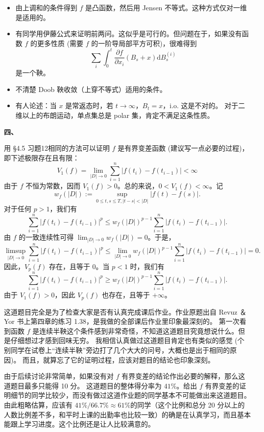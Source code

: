 {\begin{itemize}
    \item 由上调和的条件得到 $f$ 是凸函数，然后用 Jensen 不等式。这种方式仅对一维是适用的。
    
    \item 有同学用伊藤公式来证明前两问。这似乎是可行的。但问题在于，如果没有函数 $f$ 的更多性质 (需要 $f$ 的一阶导局部平方可积)，很难得到
    $$\sum_{i} \int_{0}^{t} \frac{\partial f}{\partial x_{i}}(B_{s}+x) \mathrm{d} B_{s}^{(i)}$$
    是一个鞅。
    
    \item 不清楚 Doob 鞅收敛（上穿不等式）适用的条件。
    
    \item 有人论述：当 $x$ 是常返态时，若 $t \rightarrow \infty$，$B_{t}=x$，i.o. 这是不对的。
    对于二维以上的布朗运动，单点集总是 polar 集，肯定不满足这条性质。
    \end{itemize}}


    \textbf{四、}

    用 §4.5 习题12相同的方法可以证明 $f$ 是有界变差函数 (建议写一点必要的过程)，即下述极限存在且有限：
    $$V_{1}(f)=\lim_{|D| \rightarrow 0} \sum_{i=1}^{n} |f(t_{i})-f(t_{i-1})|<\infty$$
    由于 $f$ 不恒为常数，因而 $V_{1}(f)>0$。总的来说，$0<V_{1}(f)<\infty$。记
    $$w_{f}(|D|):=\sup _{0 \leq t, s \leq T,|t-s|<|D|}|f(t)-f(s)|.$$
    对于任何 $p>1$，我们有
    $$\sum_{i=1}^{n}|f(t_{i})-f(t_{i-1})|^{p} \leq w_{f}(|D|)^{p-1} \sum_{i=1}^{n}|f(t_{i})-f(t_{i-1})|.$$
    由 $f$ 的一致连续性可得 $\lim_{|D| \rightarrow 0} w_{f}(|D|)=0$。于是，
    $$\limsup_{|D| \rightarrow 0} \sum_{i=1}^{n} | f(t_{i})-f(t_{i-1})|^{p} 
    \leq \lim_{|D| \rightarrow 0} w_{f}(|D|)^{p-1} \sum_{i=1}^{n}|f(t_{i})-f(t_{i-1})|=0.$$
    因此，$V_{p}(f)$ 存在，且等于 $0$。当 $p<1$ 时，我们有
    $$\sum_{i=1}^{n}|f(t_{i})-f(t_{i-1})|^{p} 
    \geq w_{f}(|D|)^{p-1} \sum_{i=1}^{n}|f(t_{i})-f(t_{i-1})|.$$
    由于 $V_{1}(f)>0$，因此 $V_{p}(f)$ 也存在，且等于 $+\infty$。

    \textcolor{0000cc}{\qquad 这道题目完全是为了检查大家是否有认真完成课后作业。作业原题出自 Revuz ＆Yor 书上第四章的练习 1.38，是我做的全部课后作业里印象最深刻的。
    第一次看到函数 $f$ 是连续半鞅这个条件感到非常奇怪，不知道这道题目究竟想说什么。但是仔细想过才感到回味无穷。
    我相信认真做过这道题目肯定也有类似的感觉 (个别同学在试卷上``连续半鞅''旁边打了几个大大的问号，大概也是出于相同的原因)。
    而且，就算忘了它的证明过程，应该对题目的结论也印象深刻。

    \qquad 由于后续讨论非常简单，如果没有对 $f$ 有界变差的结论作出必要的解释，那么这道题目最多只能得 10 分。
    这道题目的整体得分率为 $41 \%$。给出 $f$ 有界变差的证明细节的同学比较少，而没有做过这道作业题的同学基本不可能做出来这道题目。
    由此粗略估算，应该有 $41 \% / 66.7 \% \approx 61 \%$的同学（这个比例和总分 20 分以上的人数比例差不多，和平时上课的出勤率也比较一致）的确是在认真学习，而且基本能跟上学习进度。这个比例还是让人比较满意的。}

